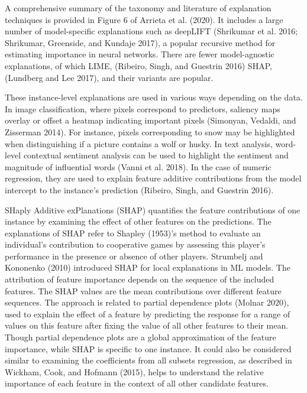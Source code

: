 \documentclass[
]{article}
\begin{document}
A comprehensive summary of the taxonomy and literature of explanation
techniques is provided in Figure 6 of Arrieta et al. (2020). It includes
a large number of model-specific explanations such as deepLIFT
(Shrikumar et al. 2016; Shrikumar, Greenside, and Kundaje 2017), a
popular recursive method for estimating importance in neural networks.
There are fewer model-agnostic explanations, of which LIME, (Ribeiro,
Singh, and Guestrin 2016) SHAP, (Lundberg and Lee 2017), and their
variants are popular.

These instance-level explanations are used in various ways depending on
the data. In image classification, where pixels correspond to
predictors, saliency maps overlay or offset a heatmap indicating
important pixels (Simonyan, Vedaldi, and Zisserman 2014). For instance,
pixels corresponding to snow may be highlighted when distinguishing if a
picture contains a wolf or husky. In text analysis, word-level
contextual sentiment analysis can be used to highlight the sentiment and
magnitude of influential words (Vanni et al. 2018). In the case of
numeric regression, they are used to explain feature additive
contributions from the model intercept to the instance's prediction
(Ribeiro, Singh, and Guestrin 2016).

SHaply Additive exPlanations (SHAP) quantifies the feature contributions
of one instance by examining the effect of other features on the
predictions. The explanations of SHAP refer to Shapley (1953)'s method
to evaluate an individual's contribution to cooperative games by
assessing this player's performance in the presence or absence of other
players. Strumbelj and Kononenko (2010) introduced SHAP for local
explanations in ML models. The attribution of feature importance depends
on the sequence of the included features. The SHAP values are the mean
contributions over different feature sequences. The approach is related
to partial dependence plots (Molnar 2020), used to explain the effect of
a feature by predicting the response for a range of values on this
feature after fixing the value of all other features to their mean.
Though partial dependence plots are a global approximation of the
feature importance, while SHAP is specific to one instance. It could
also be considered similar to examining the coefficients from all
subsets regression, as described in Wickham, Cook, and Hofmann (2015),
helps to understand the relative importance of each feature in the
context of all other candidate features.
\end{document}
